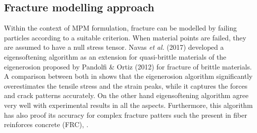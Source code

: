 \documentclass[preprint,12pt,a4paper]{elsarticle}
\begin{document}
\subsection{Fracture modelling approach}
\label{sec:2.3}

Within the context of MPM formulation, fracture can be modelled by
failing particles according to a suitable criterion. When material
points are failed, they are assumed to have a null stress
tensor. Navas {\it et al.} (2017)\cite{Navas_2017_ES} developed a
eigensoftening algorithm as an extension for quasi-brittle materials
of the eigenerosion proposed by Pandolfi \& Ortiz
(2012)\cite{Pandolfi_2012} for fracture of brittle materials. A
comparison between both in \cite{Navas_2017_ES} shows that
the eigenerosion algorithm significantly overestimates the tensile
stress and the strain peaks, while it captures the forces and crack
patterns accurately. On the other hand eigensoftening algorithm agree
very well with experimental results in all the aspects. Furthermore,
this algorithm has also proof its accuracy for complex fracture
patters such the present in fiber reinforces concrete (FRC),
\cite{Navas_2018_ES}.\\
\end{document}
